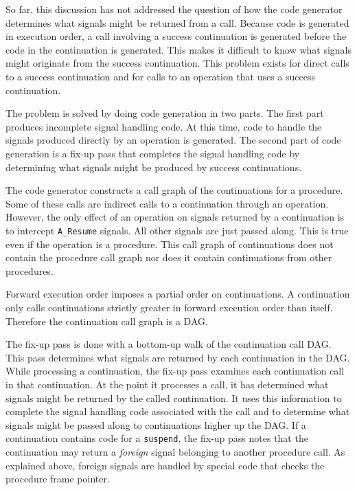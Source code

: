 So far, this discussion has not addressed the question of how the code
generator determines what signals might be returned from a
call. Because code is generated in execution order, a call involving a
success continuation is generated before the code in the continuation
is generated. This makes it difficult to know what signals might
originate from the success continuation. This problem exists for
direct calls to a success continuation and for calls to an operation
that uses a success continuation.

The problem is solved by doing code generation in two parts. The first
part produces incomplete signal handling code. At this time, code to
handle the signals produced directly by an operation is generated. The
second part of code generation is a fix-up pass that completes the
signal handling code by determining what signals might be produced by
success continuations.

The code generator constructs a call graph of the continuations for a
procedure. Some of these calls are indirect calls to a continuation
through an operation. However, the only effect of an operation on
signals returned by a continuation is to intercept \texttt{A\_Resume}
signals. All other signals are just passed along. This is true even if
the operation is a procedure. This call graph of continuations does
not contain the procedure call graph nor does it contain continuations
from other procedures.

Forward execution order imposes a partial order on continuations. A
continuation only calls continuations strictly greater in forward
execution order than itself. Therefore the continuation call graph is
a DAG.

The fix-up pass is done with a bottom-up walk of the continuation call
DAG. This pass determines what signals are returned by each
continuation in the DAG. While processing a continuation, the fix-up
pass examines each continuation call in that continuation. At the
point it processes a call, it has determined what signals might be
returned by the called continuation. It uses this information to
complete the signal handling code associated with the call and to
determine what signals might be passed along to continuations higher
up the DAG. If a continuation contains code for a \texttt{suspend}, the fix-up
pass notes that the continuation may return a \textit{foreign} signal
belonging to another procedure call. As explained above, foreign
signals are handled by special code that checks the procedure frame
pointer.


